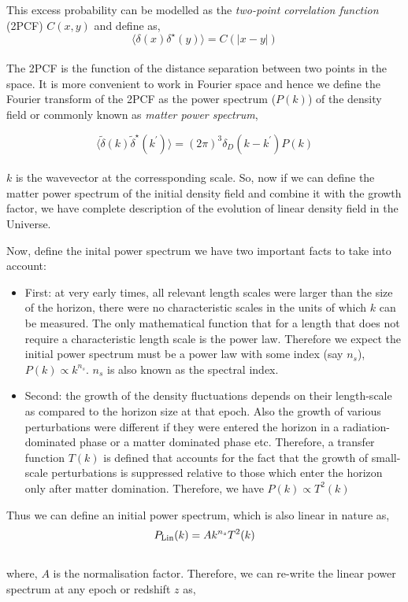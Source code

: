 This excess probability can be modelled as the {\it two-point correlation function} (2PCF) 
$C(x,y)$ and define as, 
\begin{equation}
	\langle \delta(x) \delta^{\star}(y) \rangle = C(|x-y|)
\end{equation}
\\
The 2PCF is the function of the distance
separation between two points in the space. It is more convenient to work in 
Fourier space and hence we define the Fourier transform of the 2PCF as the 
power spectrum ($P(k)$) of the density field or commonly known as
{\it matter power spectrum},

\begin{equation}
		\langle \tilde{\delta}(k) \tilde{\delta}^{\star}(k^{\prime}) \rangle = 
				(2\pi)^3 \delta_D(k-k^{\prime}) P(k)
\end{equation}
\\
$k$ is the wavevector at the corressponding scale. So, now if we can 
define the matter power spectrum of the initial density field and combine
it with the growth factor, we have complete description of the evolution 
of linear density field in the Universe. 

Now, define the inital power spectrum we have two important facts to 
take into account:
\begin{itemize}
  \item	First: at very early times, all relevant length scales
	were larger than the size of the horizon, there were no characteristic scales
	in the units of which $k$ can be measured. The only mathematical function
	that for a length that does not require a characteristic length scale is
	the power law. Therefore we expect the initial power spectrum must be a power
	law with some index (say $n_s$), $P(k)\propto k^{n_s}$. $n_s$ is also known
	as the spectral index.
  \item Second: the growth of the density fluctuations depends on their length-scale
  	as compared to the horizon size at that epoch. Also the growth of various
  	perturbations were different if they were entered the horizon in a radiation-
  	dominated phase or a matter dominated phase etc. Therefore, a transfer function $T(k)$
  	is defined that accounts for the fact that the growth of small-scale perturbations
  	is suppressed relative to those which enter the horizon only after matter domination.
  	Therefore, we have $P(k) \propto T^2(k)$ 
\end{itemize}

Thus we can define an initial power spectrum, which is also linear in nature as,
\begin{equation}
	P_{\rm Lin}(k) = A k^{n_s} T^2(k)
\end{equation}
\\
where, $A$ is the normalisation factor. Therefore, we can re-write the linear
power spectrum at any epoch or redshift $z$ as,

